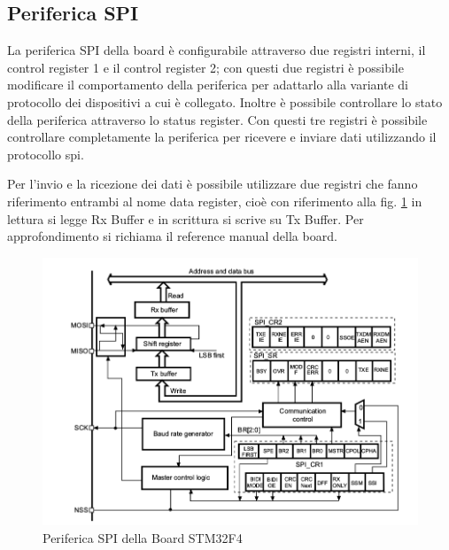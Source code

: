 \subsection{Periferica SPI}
La periferica SPI della board è configurabile attraverso due registri interni, il control register 1 e il control register 2; con questi due registri è possibile modificare il comportamento della periferica per adattarlo alla variante di protocollo dei dispositivi a cui è collegato.
Inoltre è possibile controllare lo stato della periferica attraverso lo status register. Con questi tre registri è possibile controllare completamente la periferica per ricevere e inviare dati utilizzando il protocollo spi.\par
Per l'invio e la ricezione dei dati è possibile utilizzare due registri che fanno riferimento entrambi al nome data register, cioè con riferimento alla fig. \ref{figure:diagramma_spi} in lettura si legge Rx Buffer e in scrittura si scrive su Tx Buffer. Per approfondimento si richiama il reference manual della board\cite{manual-stm32f4}.
\begin{figure}[H]
	\centering
	\includegraphics[width=\textwidth]{figure/diagramma_spi.png}
	\caption{Periferica SPI della Board STM32F4\label{figure:diagramma_spi}}
\end{figure}

